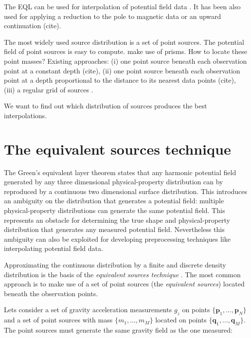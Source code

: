 \documentclass[twocolumn]{article}
\begin{document}
The EQL can be used for interpolation of potential field data
\citep{cordell1992, cooper2000}.
It has been also used for applying a reduction to the pole to magnetic data
\citep{guspi2009, silva1986, emilia1973, nakatsuka2006} or an upward
continuation (cite).

The most widely used source distribution is a set of point sources.
The potential field of point sources is easy to compute.
\citet{barnes2011} make use of prisms.
How to locate these point masses?
Existing approaches:
(i) one point source beneath each observation point at a constant depth (cite),
(ii) one point source beneath each observation point at a depth proportional to
the distance to its nearest data points (cite),
(iii) a regular grid of sources \citep{barnes2011}.

We want to find out which distribution of sources produces the best
interpolations.



\section{The equivalent sources technique}

The Green's equivalent layer theorem states that any harmonic potential field
generated by any three dimensional physical-property distribution can by
reproduced by a continuous two dimensional surface distribution.
This introduces an ambiguity on the distribution that generates
a potential field: multiple physical-property distributions can generate the
same potential field.
This represents an obstacle for determining the true shape and
physical-property distribution that generates any measured potential field.
Nevertheless this ambiguity can also be exploited for developing preprocessing
techniques like interpolating potential field data.

Approximating the continuous distribution by a finite and discrete density
distribution is the basis of the \emph{equivalent sources technique}
\citep{dampney1969}.
The most common approach is to make use of a set of point sources (the
\emph{equivalent sources}) located beneath the observation points.

Lets consider a set of gravity acceleration measurements $g_z$ on points
$\{\mathbf{p}_1, \ldots, \mathbf{p}_N\}$ and a set of point sources with mass
$\{m_1, \ldots, m_M\}$ located on points
$\{\mathbf{q}_1, \ldots, \mathbf{q}_M\}$.
The point sources must generate the same gravity field as the one measured:
\end{document}
